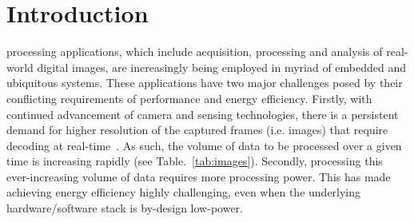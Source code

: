 \documentclass[journal]{IEEEtran}
\begin{document}
%
\IEEEpeerreviewmaketitle



\section{Introduction}
% 
% 
% 
% 
 processing applications, which include acquisition, processing and analysis of real-world digital images, are increasingly being employed in myriad of embedded and ubiquitous systems. These applications have two major challenges posed by their conflicting requirements of performance and energy efficiency. Firstly, with continued advancement of camera and sensing technologies, there is a persistent demand for higher resolution of the captured frames (i.e. images) that require decoding at real-time~\cite{beckett1998apparatus}. As such, the volume of data to be processed over a given time is increasing rapidly (see Table.~\ref{tab:images}). Secondly, processing this ever-increasing volume of data requires more processing power. This has made achieving energy efficiency highly challenging, even when the underlying hardware\slash software stack is by-design low-power.


 
\end{document}
